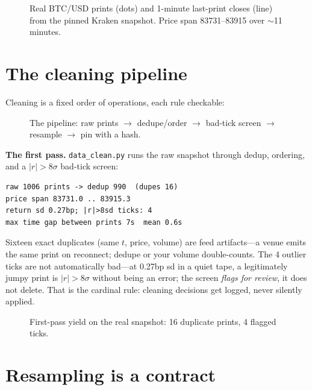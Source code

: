 \begin{figure}[htbp]\centering

\caption{Real BTC/USD prints (dots) and 1-minute last-print closes (line) from the pinned
Kraken snapshot. Price span 83731--83915 over $\sim$11 minutes.}
\label{fig:prints}
\end{figure}

\section{The cleaning pipeline}\label{sec:clean}

Cleaning is a fixed order of operations, each rule checkable:

\begin{figure}[htbp]\centering

\caption{The pipeline: raw prints $\to$ dedupe/order $\to$ bad-tick screen $\to$ resample
$\to$ pin with a hash.}
\label{fig:pipeline}
\end{figure}

\begin{example}\label{ex:clean}
\textbf{The first pass.} \texttt{data\_clean.py} runs the raw snapshot through dedup,
ordering, and a $|r|>8\sigma$ bad-tick screen:
\begin{lstlisting}[numbers=none]
raw 1006 prints -> dedup 990  (dupes 16)
price span 83731.0 .. 83915.3
return sd 0.27bp; |r|>8sd ticks: 4
max time gap between prints 7s  mean 0.6s
\end{lstlisting}
\begin{solution}
Sixteen exact duplicates (same $t$, price, volume) are feed artifacts---a venue emits the
same print on reconnect; dedupe or your volume double-counts. The 4 outlier ticks are not
automatically bad---at 0.27bp sd in a quiet tape, a legitimately jumpy print is $|r|>8\sigma$
without being an error; the screen \emph{flags for review}, it does not delete. That is the
cardinal rule: cleaning decisions get logged, never silently applied.
\end{solution}
\end{example}

\begin{figure}[htbp]\centering

\caption{First-pass yield on the real snapshot: 16 duplicate prints, 4 flagged ticks.}
\label{fig:dedup}
\end{figure}

\section{Resampling is a contract}\label{sec:resample}

